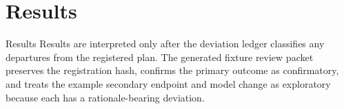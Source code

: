 \documentclass[
  ignorenonframetext,
]{beamer}
\author{\texorpdfstring{}{}}
\date{}
\begin{document}
\section{Results}\label{results}

\begin{frame}[allowframebreaks]{Results}
Results are interpreted only after the deviation ledger classifies any
departures from the registered plan. The generated fixture review packet
preserves the registration hash, confirms the primary outcome as
confirmatory, and treats the example secondary endpoint and model change
as exploratory because each has a rationale-bearing deviation.
\end{frame}
\end{document}
